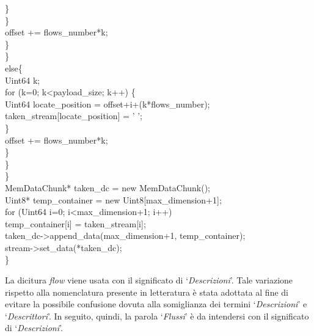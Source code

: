 \begin{code}
						\}\\
					\}\\
					offset += flows\_number*k;\\
				\}\\
			\}\\
			else\{\\
				Uint64 k;\\
				for (k=0; k<payload\_size; k++) \{\\
					Uint64 locate\_position = offset+i+(k*flows\_number);\\
					taken\_stream[locate\_position] = ' ';\\
				\}\\
				offset += flows\_number*k;\\
			\}\\
		\}\\
	\}\\
	MemDataChunk* taken\_dc = new MemDataChunk();\\
	Uint8* temp\_container = new Uint8[max\_dimension+1];\\
	for (Uint64 i=0; i<max\_dimension+1; i++)\\
		temp\_container[i] = taken\_stream[i];\\
	taken\_dc->append\_data(max\_dimension+1, temp\_container);\\
	stream->set\_data(*taken\_dc);\\
\}\\
\end{code}

\begin{notabene}
La dicitura \textit{flow} viene usata con il significato di
`\emph{Descrizioni}'. Tale variazione rispetto alla nomenclatura presente in
letteratura è stata adottata al fine di evitare la possibile confusione dovuta alla somiglianza dei termini `\emph{Descrizioni}' e `\emph{Descrittori}'. In seguito, quindi, la parola `\emph{Flussi}' è da intendersi con il significato di `\emph{Descrizioni}'.
\end{notabene}